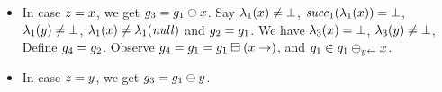 \begin{enumerate}
\begin{enumerate}
  \begin{itemize}
  \item In case $z=x$, we get $g_3=g_1\ominus{\ensuremath{x}}$.
    Say
    $\lambda_1(x)\neq\bot$, %
    ${\it succ}_1(\lambda_1(x))=\bot$, %
    $\lambda_1(y)\neq\bot$, %
    $\lambda_1(x)\neq\lambda_1({\it null})$ %
    and %
    $g_2=g_1$.
    We have 
    $\lambda_3(x)=\bot$, %
    $\lambda_3(y)\neq\bot$, %
    Define $g_4=g_2$. 
    Observe $g_4=g_1=g_1\boxminus({x}\rightarrow)$,
    and $g_1\in g_1\oplus_{{y}\leftarrow}{x}$.
  \item In case $z=y$, we get $g_3=g_1\ominus{\ensuremath{y}}$.

\end{itemize}
\end{enumerate}
\end{enumerate}
